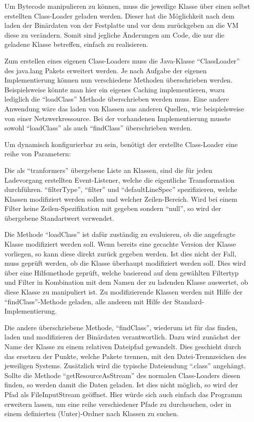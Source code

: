 Um Bytecode manipulieren zu können, muss die jeweilige Klasse über einen selbst erstellten Class-Loader geladen werden. Dieser hat die Möglichkeit nach dem laden der Binärdaten von der Festplatte und vor dem zurückgeben an die \ac{VM} diese zu verändern. Somit sind jegliche Änderungen am Code, die nur die geladene Klasse betreffen, einfach zu realisieren.

Zum erstellen eines eigenen Class-Loaders muss die Java-Klasse "`ClassLoader"' des java.lang Pakets erweitert werden. Je nach Aufgabe der eigenen Implementierung können nun verschiedene Methoden überschrieben werden. Beispielsweise könnte man hier ein eigenes Caching implementieren, wozu lediglich die "`loadClass"' Methode überschrieben werden muss. Eine andere Anwendung wäre das laden von Klassen aus anderen Quellen, wie beispielsweise von einer Netzwerkressource. Bei der vorhandenen Implementierung musste sowohl "`loadClass"' als auch "`findClass"' überschrieben werden.

Um dynamisch konfigurierbar zu sein, benötigt der erstellte Class-Loader eine reihe von Parametern:



Die als "`tranformers"' übergebene Liste an Klassen, sind die für jeden Ladevorgang erstellten Event-Listener, welche die eigentliche Transformation durchführen. "`filterType"', "`filter"' und "`defaultLineSpec"' spezifizieren, welche Klassen modifiziert werden sollen und welcher Zeilen-Bereich. Wird bei einem Filter keine Zeilen-Spezifikation mit gegeben sondern "`null"', so wird der übergebene Standartwert verwendet.

Die Methode "`loadClass"' ist dafür zuständig zu evaluieren, ob die angefragte Klasse modifiziert werden soll. Wenn bereits eine gecachte Version der Klasse vorliegen, so kann diese direkt zurück gegeben werden. Ist dies nicht der Fall, muss geprüft werden, ob die Klasse überhaupt modifiziert werden soll. Dies wird über eine Hilfsmethode geprüft, welche basierend auf dem gewählten Filtertyp und Filter in Kombination mit dem Namen der zu ladenden Klasse auswertet, ob diese Klasse zu manipuliert ist. Zu modifizierende Klassen werden mit Hilfe der "`findClass"'-Methode geladen, alle anderen mit Hilfe der Standard-Implementierung.

Die andere überschriebene Methode, "`findClass"', wiederum ist für das finden, laden und modifizieren der Binärdaten verantwortlich. Dazu wird zunächst der Name der Klasse zu einem relativen Dateipfad gewandelt. Dies geschieht durch das ersetzen der Punkte, welche Pakete trennen, mit den Datei-Trennzeichen des jeweiligen Systems. Zusätzlich wird die typische Dateiendung "`.class"' angehängt. Sollte die Methode "`getResourceAsStream"' des normalen Class-Loaders diesen finden, so werden damit die Daten geladen. Ist dies nicht möglich, so wird der Pfad als FileInputStream geöffnet. Hier würde sich auch einfach das Programm erweitern lassen, um eine reihe verschiedener Pfade zu durchsuchen, oder in einem definierten (Unter)-Ordner nach Klassen zu suchen.

